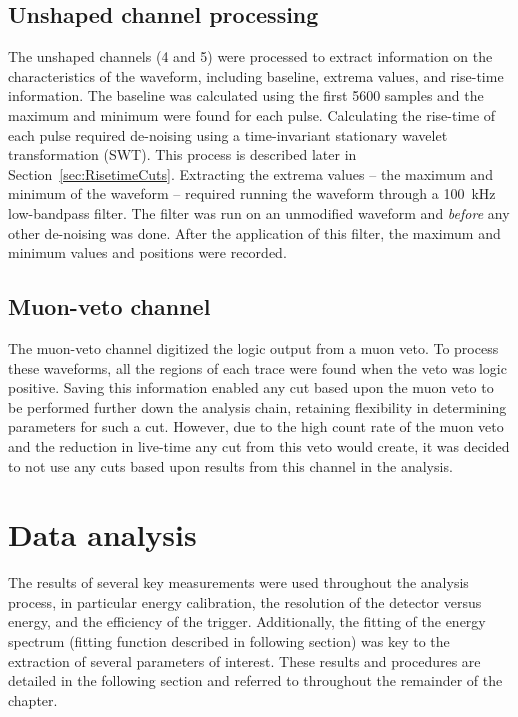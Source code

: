 		\subsection{Unshaped channel processing}
		\label{sec:UnshapedWFProc}

The unshaped channels (4 and 5) were processed to extract information on the characteristics of the waveform, including baseline, extrema values, and rise-time information.    The baseline was calculated using the first 5600 samples and the maximum and minimum were found for each pulse.  Calculating the rise-time of each pulse required de-noising using a time-invariant stationary wavelet transformation (SWT).  This process is described later in Section~\ref{sec:RisetimeCuts}.  Extracting the extrema values -- the maximum and minimum of the waveform -- required running the waveform through a 100~kHz low-bandpass filter.  The filter was run on an unmodified waveform and \emph{before} any other de-noising was done.  After the application of this filter, the maximum and minimum values and positions were recorded.  

		\subsection{Muon-veto channel}
		\label{sec:MuonProc}

The muon-veto channel digitized the logic output from a muon veto.  To process these waveforms, all the regions of each trace were found when the veto was logic positive.  Saving this information enabled any cut based upon the muon veto to be performed further down the analysis chain, retaining flexibility in determining parameters for such a cut.  However, due to the high count rate of the muon veto and the reduction in live-time any cut from this veto would create, it was decided to not use any cuts based upon results from this channel in the analysis.  


	\section{Data analysis}
	\label{sec:BeGeDataAnalysis}
	
	The results of several key measurements were used throughout the analysis process, in particular energy calibration, the resolution of the detector versus energy, and the efficiency of the trigger.  Additionally, the fitting of the energy spectrum (fitting function described in following section) was key to the extraction of several parameters of interest.  These results and procedures are detailed in the following section and referred to throughout the remainder of the chapter.
	
